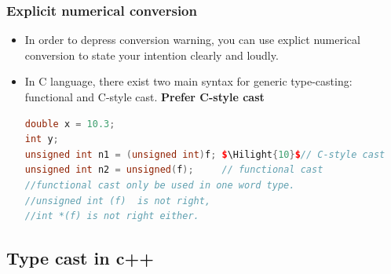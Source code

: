 \documentclass[a4paper,12pt,twoside]{book}
\newcommand{\Hilight}[1]{\makebox[0pt][l]{\color{yellow}\rule[-3pt]{#1em}{11pt}}}
\begin{document}
\subsubsection{Explicit numerical conversion}
\begin{itemize}
\item In order to depress conversion warning, you can use explict numerical conversion to state your intention clearly and loudly.

\item In C language, there exist two main syntax for generic type-casting: functional and C-style cast.  \textbf{Prefer C-style cast}

\begin{lstlisting}[frame=single, language=c++, mathescape=true]
double x = 10.3;
int y;
unsigned int n1 = (unsigned int)f; $\Hilight{10}$// C-style cast
unsigned int n2 = unsigned(f);     // functional cast
//functional cast only be used in one word type.
//unsigned int (f)  is not right,
//int *(f) is not right either.
\end{lstlisting}

\end{itemize}

\subsection{Type cast in c++}
\end{document}
